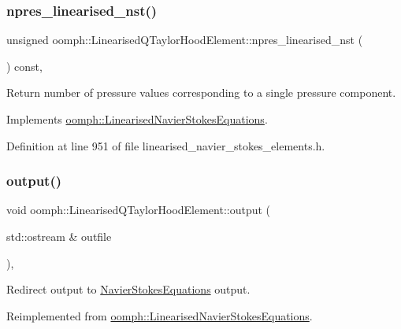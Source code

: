 \subsubsection{\texorpdfstring{npres\+\_\+linearised\+\_\+nst()}{npres\_linearised\_nst()}}
{\footnotesize\ttfamily unsigned oomph\+::\+Linearised\+Q\+Taylor\+Hood\+Element\+::npres\+\_\+linearised\+\_\+nst (\begin{DoxyParamCaption}{ }\end{DoxyParamCaption}) const\hspace{0.3cm}{\ttfamily [inline]}, {\ttfamily [virtual]}}



Return number of pressure values corresponding to a single pressure component. 



Implements \hyperlink{classoomph_1_1LinearisedNavierStokesEquations_a2dbceef603d7e72bd709643107d2e975}{oomph\+::\+Linearised\+Navier\+Stokes\+Equations}.



Definition at line 951 of file linearised\+\_\+navier\+\_\+stokes\+\_\+elements.\+h.

\mbox{\label{classoomph_1_1LinearisedQTaylorHoodElement_a0a51768cb37a15ede6bc402a2c22e718}} 
\subsubsection{\texorpdfstring{output()}{output()}\hspace{0.1cm}{\footnotesize\ttfamily [1/4]}}
{\footnotesize\ttfamily void oomph\+::\+Linearised\+Q\+Taylor\+Hood\+Element\+::output (\begin{DoxyParamCaption}\item[{std\+::ostream \&}]{outfile }\end{DoxyParamCaption})\hspace{0.3cm}{\ttfamily [inline]}, {\ttfamily [virtual]}}



Redirect output to \hyperlink{classoomph_1_1NavierStokesEquations}{Navier\+Stokes\+Equations} output. 



Reimplemented from \hyperlink{classoomph_1_1LinearisedNavierStokesEquations_a87e366a3fe677cbbb99f4cba17d0f4c6}{oomph\+::\+Linearised\+Navier\+Stokes\+Equations}.



